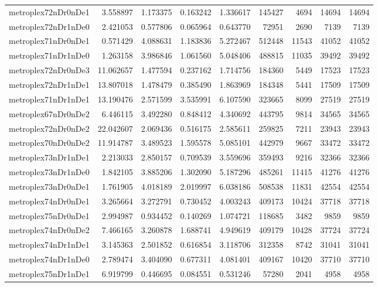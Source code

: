 \begin{longtable}{|l|r|r|r|r|r|r|r|r|}
metroplex72nDr0nDe1 & 3.558897 & 1.173375 & 0.163242 & 1.336617 & 145427 & 4694 & 14694 & 14694 \\
metroplex72nDr1nDe0 & 2.421053 & 0.577806 & 0.065964 & 0.643770 & 72951 & 2690 & 7139 & 7139 \\
metroplex71nDr0nDe1 & 0.571429 & 4.088631 & 1.183836 & 5.272467 & 512448 & 11543 & 41052 & 41052 \\
metroplex71nDr1nDe0 & 1.263158 & 3.986846 & 1.061560 & 5.048406 & 488815 & 11035 & 39492 & 39492 \\
metroplex72nDr0nDe3 & 11.062657 & 1.477594 & 0.237162 & 1.714756 & 184360 & 5449 & 17523 & 17523 \\
metroplex72nDr1nDe1 & 13.807018 & 1.478479 & 0.385490 & 1.863969 & 184348 & 5441 & 17509 & 17509 \\
metroplex71nDr1nDe1 & 13.190476 & 2.571599 & 3.535991 & 6.107590 & 323665 & 8099 & 27519 & 27519 \\
metroplex67nDr0nDe2 & 6.446115 & 3.492280 & 0.848412 & 4.340692 & 443795 & 9814 & 34565 & 34565 \\
metroplex72nDr0nDe2 & 22.042607 & 2.069436 & 0.516175 & 2.585611 & 259825 & 7211 & 23943 & 23943 \\
metroplex70nDr0nDe2 & 11.914787 & 3.489523 & 1.595578 & 5.085101 & 442979 & 9667 & 33472 & 33472 \\
metroplex73nDr1nDe1 & 2.213033 & 2.850157 & 0.709539 & 3.559696 & 359493 & 9216 & 32366 & 32366 \\
metroplex73nDr1nDe0 & 1.842105 & 3.885206 & 1.302090 & 5.187296 & 485261 & 11415 & 41276 & 41276 \\
metroplex73nDr0nDe1 & 1.761905 & 4.018189 & 2.019997 & 6.038186 & 508538 & 11831 & 42554 & 42554 \\
metroplex74nDr0nDe1 & 3.265664 & 3.272791 & 0.730452 & 4.003243 & 409173 & 10424 & 37718 & 37718 \\
metroplex75nDr0nDe1 & 2.994987 & 0.934452 & 0.140269 & 1.074721 & 118685 & 3482 & 9859 & 9859 \\
metroplex74nDr0nDe2 & 7.466165 & 3.260878 & 1.688741 & 4.949619 & 409179 & 10428 & 37724 & 37724 \\
metroplex74nDr1nDe1 & 3.145363 & 2.501852 & 0.616854 & 3.118706 & 312358 & 8742 & 31041 & 31041 \\
metroplex74nDr1nDe0 & 2.789474 & 3.404090 & 0.677311 & 4.081401 & 409167 & 10420 & 37710 & 37710 \\
metroplex75nDr1nDe1 & 6.919799 & 0.446695 & 0.084551 & 0.531246 & 57280 & 2041 & 4958 & 4958 \\

\end{longtable}

